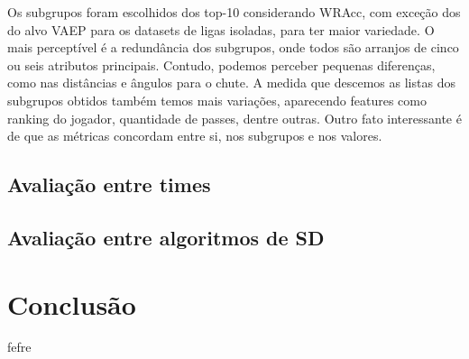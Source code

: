 \documentclass{article}
\begin{document}
Os subgrupos foram escolhidos dos top-10 considerando WRAcc, com exceção dos do alvo VAEP para os 
datasets de ligas isoladas, para ter maior variedade. O mais perceptível é a redundância dos subgrupos, 
onde todos são arranjos de cinco ou seis atributos principais. Contudo, podemos perceber pequenas 
diferenças, como nas distâncias e ângulos para o chute. A medida que descemos as listas dos subgrupos 
obtidos também temos mais variações, aparecendo features como ranking do jogador, quantidade de passes, 
dentre outras. Outro fato interessante é de que as métricas concordam entre si, nos subgrupos e nos valores.

\subsection{Avaliação entre times}

\subsection{Avaliação entre algoritmos de SD}

\section{Conclusão}

fefre

\newpage

\renewcommand{\refname}{Referências Bibliográficas}

\nocite{*}
\end{document}
